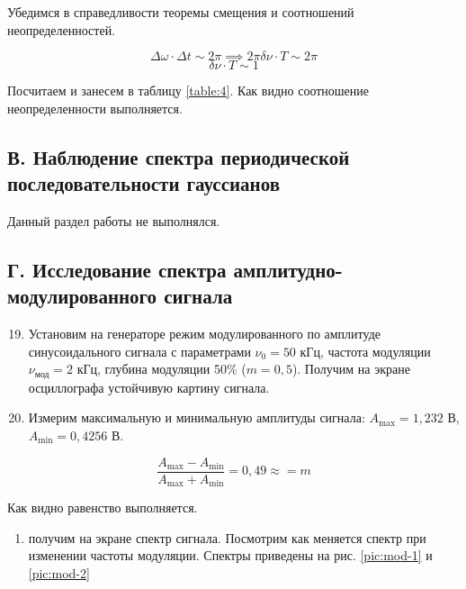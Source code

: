 \documentclass[a4paper,12pt]{article}
\begin{document}
Убедимся в справедливости теоремы смещения и соотношений неопределенностей.

\begin{equation*}
    \Delta \omega \cdot \Delta t \sim 2 \pi \implies 2 \pi \delta \nu \cdot T \sim 2 \pi
\end{equation*}
\begin{equation*}
    \delta \nu \cdot T \sim 1
\end{equation*}

Посчитаем и занесем в таблицу \ref{table:4}. Как видно соотношение неопределенности выполняется.

\subsection{В. Наблюдение спектра периодической последовательности гауссианов}

Данный раздел работы не выполнялся.

\subsection{Г. Исследование спектра амплитудно-модулированного сигнала}

\begin{enumerate}
    \setcounter{enumi}{18}
    \item Установим на генераторе режим модулированного по амплитуде синусоидального сигнала с параметрами $\nu_0 = 50$ кГц, частота модуляции $\nu_\text{мод} = 2$ кГц, глубина модуляции 50\% ($m = 0,5$). Получим на экране осциллографа устойчивую картину сигнала.
    \item Измерим максимальную и минимальную амплитуды сигнала: $A_\text{max} = 1,232$ В, $A_\text{min} = 0,4256$ В.
\end{enumerate}

\begin{equation}
    \frac{A_\text{max} - A_\text{min}}{A_\text{max} + A_\text{min}} = 0,49 \approx = m
\end{equation}

Как видно равенство выполняется.

\begin{enumerate}[resume]
    \item получим на экране спектр сигнала. Посмотрим как меняется спектр при изменении частоты модуляции. Спектры приведены на рис. \ref{pic:mod-1} и \ref{pic:mod-2}
\end{enumerate}
\end{document}
